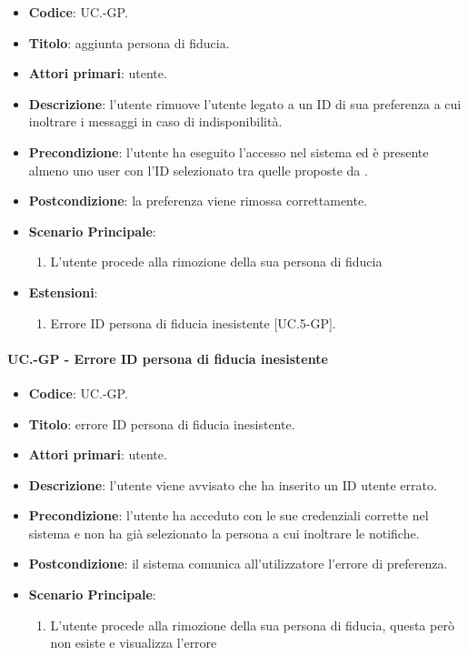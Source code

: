 	\begin{itemize}
		\item \textbf{Codice}: UC\theuccount.\thesubuccount-GP.
		\item \textbf{Titolo}: aggiunta persona di fiducia.
		\item \textbf{Attori primari}: utente.
		\item \textbf{Descrizione}:  l’utente rimuove l'utente legato a un ID di sua preferenza a cui inoltrare i messaggi in caso di indisponibilità.
		\item \textbf{Precondizione}: l’utente ha eseguito l'accesso nel sistema ed è presente almeno uno user con l'ID selezionato tra quelle proposte da \progetto.
		\item \textbf{Postcondizione}: la preferenza viene rimossa correttamente.
		\item \textbf{Scenario Principale}:
		\begin{enumerate}
			\item L'utente procede alla rimozione della sua persona di fiducia
		\end{enumerate}
		\item \textbf{Estensioni}:
		\begin{enumerate}
			\item Errore ID persona di fiducia inesistente [UC\theuccount.5-GP].
		\end{enumerate}
	\end{itemize}
	
	\paragraph{UC\theuccount.\thesubuccount-GP - Errore ID persona di fiducia inesistente}
	
	\begin{itemize}
		\item \textbf{Codice}: UC\theuccount.\thesubuccount-GP.
		\item \textbf{Titolo}: errore ID persona di fiducia inesistente.
		\item \textbf{Attori primari}: utente.
		\item \textbf{Descrizione}: l’utente viene avvisato che ha inserito un ID utente errato.
		\item \textbf{Precondizione}: l’utente ha acceduto con le sue credenziali corrette nel sistema e non ha già selezionato la persona a cui inoltrare le notifiche.
		\item \textbf{Postcondizione}: il sistema comunica all’utilizzatore l’errore di preferenza.
		\item \textbf{Scenario Principale}:
		\begin{enumerate}
			\item L'utente procede alla rimozione della sua persona di fiducia, questa però non esiste e
			visualizza l'errore
		\end{enumerate}
	\end{itemize}

